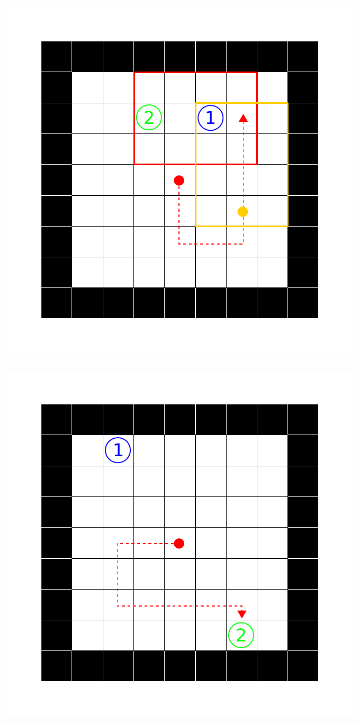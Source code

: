 \begin{figure}[ht!]
	\begin{subfigure}[c]{0.5\textwidth}
		\includegraphics[keepaspectratio,width=\textwidth]{abbildungen/sample_seen.pdf}
		\subcaption{}
		\label{sample_seen}
	\end{subfigure}
	\begin{subfigure}[c]{0.5\textwidth}
		\includegraphics[keepaspectratio,width=\textwidth]{abbildungen/sample_visited.pdf}

\end{subfigure}
\end{figure}
